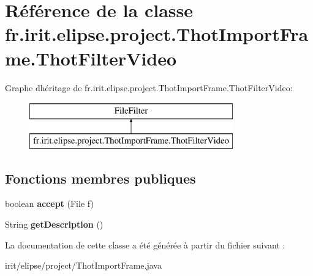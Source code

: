 \hypertarget{classfr_1_1irit_1_1elipse_1_1project_1_1_thot_import_frame_1_1_thot_filter_video}{}\section{Référence de la classe fr.\+irit.\+elipse.\+project.\+Thot\+Import\+Frame.\+Thot\+Filter\+Video}
\label{classfr_1_1irit_1_1elipse_1_1project_1_1_thot_import_frame_1_1_thot_filter_video}
Graphe d\textquotesingle{}héritage de fr.\+irit.\+elipse.\+project.\+Thot\+Import\+Frame.\+Thot\+Filter\+Video\+:\begin{figure}[H]
\begin{center}
\leavevmode
\includegraphics[height=2.000000cm]{classfr_1_1irit_1_1elipse_1_1project_1_1_thot_import_frame_1_1_thot_filter_video}
\end{center}
\end{figure}
\subsection*{Fonctions membres publiques}
\begin{DoxyCompactItemize}
\item 
\mbox{\label{classfr_1_1irit_1_1elipse_1_1project_1_1_thot_import_frame_1_1_thot_filter_video_a25344bec81a84214b4d1dc8e70168e52}} 
boolean {\bfseries accept} (File f)
\item 
\mbox{\label{classfr_1_1irit_1_1elipse_1_1project_1_1_thot_import_frame_1_1_thot_filter_video_a5d98b81272537fe940bf4d0506ee51c8}} 
String {\bfseries get\+Description} ()
\end{DoxyCompactItemize}


La documentation de cette classe a été générée à partir du fichier suivant \+:\begin{DoxyCompactItemize}
\item 
irit/elipse/project/Thot\+Import\+Frame.\+java\end{DoxyCompactItemize}

